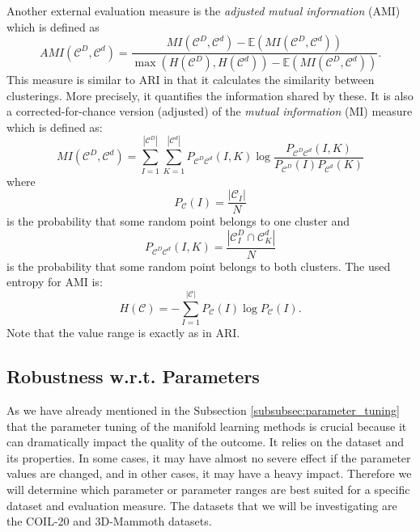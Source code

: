 Another external evaluation measure is the \textit{adjusted mutual information} (AMI) which is defined as 
\begin{equation}
    AMI(\mathcal{C}^D,\mathcal{C}^d)= \frac{MI(\mathcal{C}^D,\mathcal{C}^d) - \mathbb{E}(MI(\mathcal{C}^D,\mathcal{C}^d))}{\max(H(\mathcal{C}^D), H(\mathcal{C}^d)) - \mathbb{E}(MI(\mathcal{C}^D,\mathcal{C}^d))}.
\end{equation}
This measure is similar to ARI in that it calculates the similarity between clusterings. More precisely, it quantifies the information shared by these. It is also a corrected-for-chance version (adjusted) of the \textit{mutual information} (MI) measure which is defined as:
\begin{equation}
    MI(\mathcal{C}^D,\mathcal{C}^d)=\sum^{|\mathcal{C}^D|}_{I=1} \sum^{|\mathcal{C}^d|}_{K=1} P_{\mathcal{C}^D\mathcal{C}^d}(I,K) \log \frac{P_{\mathcal{C}^D\mathcal{C}^d}(I,K)}{P_{\mathcal{C}^D}(I)P_{\mathcal{C}^d}(K)}
\end{equation}
where 
\begin{equation}
    P_{\mathcal{C}}(I) = \frac{|\mathcal{C}_I|}{N}
\end{equation}
is the probability that some random point belongs to one cluster and 
\begin{equation}
    P_{\mathcal{C}^D\mathcal{C}^d}(I,K) = \frac{|\mathcal{C}^D_I \cap \mathcal{C}^d_K|}{N}
\end{equation}
is the probability that some random point belongs to both clusters.
The used entropy for AMI is:
\begin{equation}
    H(\mathcal{C}) = - \sum^{|\mathcal{C}|}_{I=1} P_{\mathcal{C}}(I) \log P_{\mathcal{C}}(I).
\end{equation}
Note that the value range is exactly as in ARI. \cite{wiki_mutual_info}

\subsection{Robustness w.r.t. Parameters}

As we have already mentioned in the Subsection \ref{subsubsec:parameter_tuning} that the parameter tuning of the manifold learning methods is crucial because it can dramatically impact the quality of the outcome. It relies on the dataset and its properties. In some cases, it may have almost no severe effect if the parameter values are changed, and in other cases, it may have a heavy impact. Therefore we will determine which parameter or parameter ranges are best suited for a specific dataset and evaluation measure. The datasets that we will be investigating are the COIL-20 and 3D-Mammoth datasets. 

